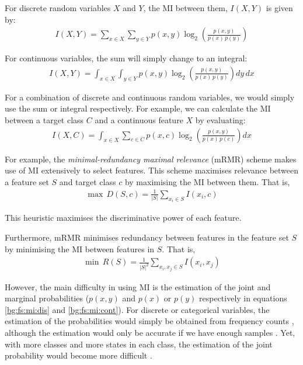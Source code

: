 \documentclass[12pt, twoside, a4paper]{report}
\begin{document}
For discrete random variables $X$ and $Y$, the MI between them, $I(X, Y)$ is given by:
\begin{align} \label{bg:fs:mi:dis}
I(X, Y) = \sum_{x \in X} \sum_{y \in Y} p(x, y) \log_2 \left(\frac{p(x, y)}{p(x) \, p(y)} \right) 
\end{align}

For continuous variables, the sum will simply change to an integral:
\begin{align} \label{bg:fs:mi:cont}
I(X, Y) = \int_{x \in X} \int_{y \in Y} p(x, y) \log_2 \left( \frac{p(x, y)}{p(x) \, p(y)} \right) dy \, dx
\end{align}

For a combination of discrete and continuous random variables, we would simply use the sum or integral respectively. For example, we can calculate the MI between a target class $C$ and a continuous feature $X$ by evaluating:
\begin{align} \label{bg:fs:mi:contDis}
I(X, C) = \int_{x \in X} \sum_{c \in C} p(x, c) \log_2 \left( \frac{p(x, y)}{p(x) \, p(c)} \right) dx
\end{align}

For example, the \textit{minimal-redundancy maximal relevance} (mRMR) scheme \cite{RefWorks:182} makes use of MI extensively to select features. This scheme maximises relevance between a feature set $S$ and target class $c$ by maximising the MI between them. That is,
\begin{align*}
\max \, D(S, c) = \frac{1}{|S|} \sum_{x_i \in S} I(x_i, c)
\end{align*}

This heuristic maximises the discriminative power of each feature.

Furthermore, mRMR minimises redundancy between features in the feature set $S$ by minimising the MI between features in $S$. That is,
\begin{align*}
\min \, R(S) = \frac{1}{|S|^2} \sum_{x_i, x_j \in S} I(x_i, x_j)
\end{align*}

However, the main difficulty in using MI is the estimation of the joint and marginal probabilities ($p(x, y)$ and $p(x)$ or $p(y)$ respectively in equations \ref{bg:fs:mi:dis} and \ref{bg:fs:mi:cont}). For discrete or categorical variables, the estimation of the probabilities would simply be obtained from frequency counts \cite{RefWorks:183}, although the estimation would only be accurate if we have enough samples \cite{RefWorks:182}. Yet, with more classes and more states in each class, the estimation of the joint probability would become more difficult \cite{RefWorks:140}.
\end{document}
